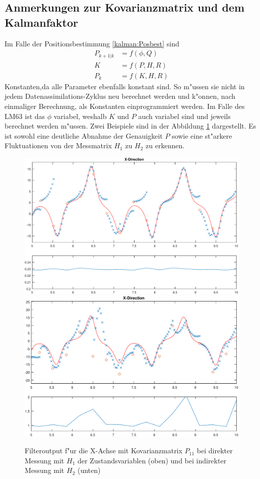 \begin{refsection}
\subsection{Anmerkungen zur Kovarianzmatrix und dem Kalmanfaktor}
Im Falle der Positionsbestimmung \eqref{kalman:Posbest} sind
\begin{align*}
P_{k+1|k}&=f(\phi, Q)\\
K&=f(P,H,R)\\
P_{k}&=f(K,H,R)
\end{align*}
Konstanten,da alle Parameter ebenfalls konstant sind. So m"ussen sie nicht in jedem Datenassimilations-Zyklus neu berechnet werden und k"onnen, nach einmaliger Berechnung, als Konstanten einprogrammiert werden. Im Falle des LM63 ist das $\phi$ variabel, weshalb $K$ und $P$ auch variabel sind und jeweils berechnet werden m"ussen. Zwei Beispiele sind in der Abbildung \ref{kalman:Kovarianz} dargestellt. Es ist sowohl eine deutliche Abnahme der Genauigkeit $P$ sowie eine st"arkere Fluktuationen von der Messmatrix $H_{1}$ zu $H_{2}$ zu erkennen.

\begin{figure}
\centering
\includegraphics[width=\hsize]{kalman/figures/H1R10S2XP.pdf}
\includegraphics[width=\hsize]{kalman/figures/H2R10S2XP.pdf}
\caption{Filteroutput f"ur die X-Achse mit Kovarianzmatrix $P_{11}$ bei direkter Messung mit $H_{1}$ der Zustandsvariablen (oben) und bei indirekter Messung mit $H_{2}$ (unten)}
\label{kalman:Kovarianz}
\end{figure}


\end{refsection}
